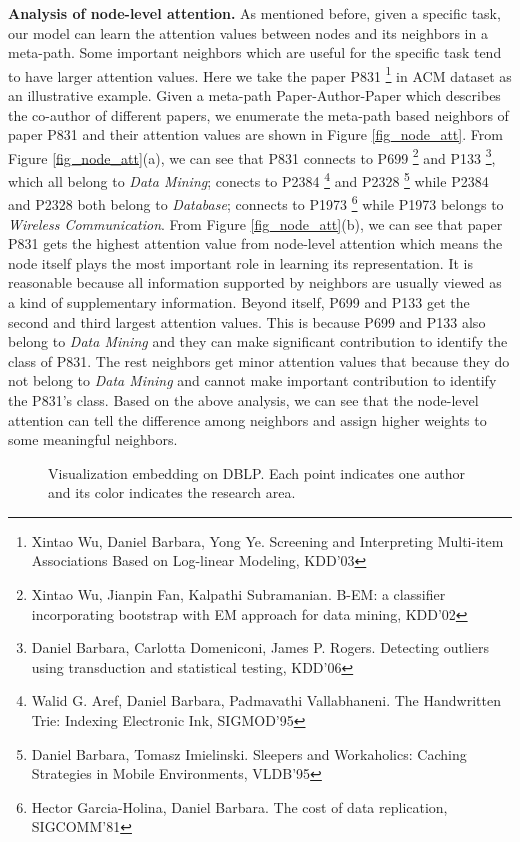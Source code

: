 \textbf{Analysis of node-level attention.} 
As mentioned before, given a specific task, our model can learn the attention values between nodes and its neighbors in a meta-path. Some important neighbors which are useful for the specific task tend to have larger attention values.
Here we take the paper P831 \footnote{Xintao Wu, Daniel Barbara, Yong Ye. Screening and Interpreting Multi-item Associations Based on Log-linear Modeling, KDD'03} in ACM dataset as an illustrative example. 
Given a meta-path Paper-Author-Paper which describes the co-author of different papers, we enumerate the meta-path based neighbors of paper P831 and their attention values are shown in Figure \ref{fig_node_att}. From Figure \ref{fig_node_att}(a), we can see that P831 connects to  P699 \footnote{Xintao Wu, Jianpin Fan, Kalpathi Subramanian. B-EM: a classifier incorporating bootstrap with EM approach for data mining, KDD'02} and P133 \footnote{Daniel Barbara, Carlotta Domeniconi, James P. Rogers. Detecting outliers using transduction and statistical testing, KDD'06}, which all belong to \emph{Data Mining}; conects to P2384 \footnote{Walid G. Aref, Daniel Barbara, Padmavathi Vallabhaneni. The Handwritten Trie: Indexing Electronic Ink, SIGMOD'95} and P2328 \footnote{Daniel Barbara, Tomasz Imielinski. Sleepers and Workaholics: Caching Strategies in Mobile Environments, VLDB'95} while P2384 and P2328 both belong to \emph{Database}; connects to P1973 \footnote{Hector Garcia-Holina, Daniel Barbara. The cost of data replication, SIGCOMM'81} while P1973 belongs to \emph{Wireless Communication}. From Figure \ref{fig_node_att}(b), we can see that paper P831 gets the highest attention value from node-level attention which means the node itself plays the most important role in learning its representation. It is reasonable because all information supported by neighbors are usually viewed as a kind of supplementary information. Beyond itself, P699 and P133 get the second and third largest attention values.
This is because P699 and P133 also belong to \emph{Data Mining} and they can make significant contribution to identify the class of  P831.
The rest neighbors get minor attention values that because they do not belong to \emph{Data Mining} and cannot make important contribution to identify the P831's class.
Based on the above analysis, we can see that the node-level attention can tell the difference among neighbors and assign higher weights to some meaningful neighbors. 
\begin{figure*}
	\centering
	
	\caption{Visualization embedding on DBLP. Each point indicates one author and its color indicates the research area. }
	\label{fig_vis}
\end{figure*}






